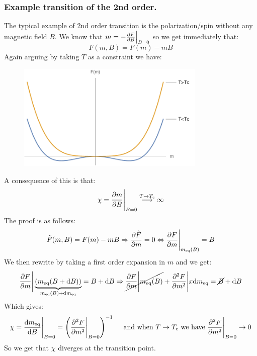 \documentclass[10pt,a4paper]{book}
\begin{document}
\subsubsection{Example transition of the 2nd order.}
The typical example of 2nd order transition is the polarization/spin without any magnetic field $B$. We know that $m = -\pdv{F}{B}\Big|_{B = 0}$ so we get immediately that:
\[
F(m, B) = F(m) - m B
\]
Again arguing by taking $T$ as a constraint we have:\\
\begin{figure}[h!]
\centering
\includegraphics[width = 0.8\textwidth]{graphs/Ex_trans_2nd_order}
\end{figure}
A consequence of this is that:
\[
\chi = \pdv{m}{B}\Bigg|_{B = 0} \stackrel{T\to T_c}{\longrightarrow} \infty
\]
The proof is as follows:
\[
\tilde{F}(m ,B) = F(m) - m B \Rightarrow \pdv{\tilde{F}}{m} = 0 \Leftrightarrow \pdv{F}{m}\Bigg|_{m_\text{eq}(B)} = B
\]
We then rewrite by taking a first order expansion in $m$ and we get:
\[
\pdv{F}{m}\Bigg|\underbrace{(m_\text{eq}(B + \dd B))}_{m_\text{eq}(B) + \dd m_\text{eq}} = B + \dd B \Rightarrow \cancel{\pdv{F}{m}\Bigg|m_\text{eq}(B)} + \pdv[2]{F}{m}\Bigg| x \dd m_\text{eq} = \cancel{B} + \dd B
\]
Which gives:
\[
\chi = \dv{m_\text{eq}}{B} \Bigg|_{B = 0} = \left(\pdv[2]{F}{m}\Bigg|_{B = 0}\right)^{-1} \quad \text{ and when } T \to T_c \text{ we have } \pdv[2]{F}{m}\Bigg|_{B = 0} \to 0 
\]
So we get that $\chi$ diverges at the transition point.
 
\end{document}
